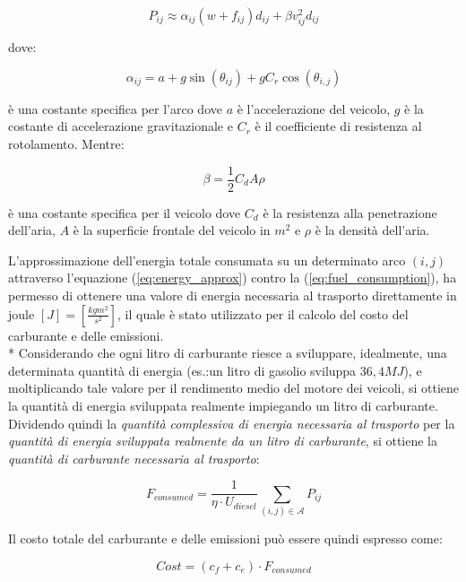 	\begin{equation}
		\label{eq:energy_approx}
		P_{ij} \approx \alpha_{ij}(w + f_{ij})d_{ij} + \beta v_{ij}^2 d_{ij}
	\end{equation}

	dove:

	\begin{equation}
		\label{eq:slope_param}
		\alpha_{ij} = a + g\sin(\theta_{ij}) + gC_r \cos(\theta_{i,j})
	\end{equation}

	è una costante specifica per l’arco dove $a$ è l’accelerazione del veicolo, $g$ è la costante di accelerazione gravitazionale e $C_{r}$ è il coefficiente di resistenza al rotolamento. Mentre:

	\begin{equation}
		\label{eq:vehicle_param}
		\beta = \frac{1}{2}C_d A \rho
	\end{equation}

	è una costante specifica per il veicolo dove $C_{d}$ è la resistenza alla penetrazione dell’aria, $A$ è la superficie frontale del veicolo in $m^2$ e $\rho$ è la densità dell’aria.

	L’approssimazione dell’energia totale consumata su un determinato arco $(i,j)$ attraverso l’equazione (\ref{eq:energy_approx}) contro la (\ref{eq:fuel_consumption}), ha permesso di ottenere una valore di energia necessaria al trasporto direttamente in joule $[J] = \left[ \frac{kg m^2}{s^2} \right]$, il quale è stato utilizzato per il calcolo del costo del carburante e delle emissioni. \\*
	Considerando che ogni litro di carburante riesce a sviluppare, idealmente, una determinata quantità di energia (es.:un litro di gasolio sviluppa $36,4 MJ$), e moltiplicando tale valore per il rendimento medio del motore dei veicoli, si ottiene la quantità di energia sviluppata realmente impiegando un litro di carburante. Dividendo quindi la \emph{quantità complessiva di energia necessaria al trasporto} per la \emph{quantità di energia sviluppata realmente da un litro di carburante}, si ottiene la \emph{quantità di carburante necessaria al trasporto}:

	\begin{equation}
		\label{eq:fuel_consumed}
		F_{consumed} = \frac{1}{\eta \cdot U_{diesel}} \sum_{(i,j) \in \mathcal{A}} P_{ij} 
	\end{equation}

	Il costo totale del carburante e delle emissioni può essere quindi espresso come:

	\begin{equation}
		\label{eq:overall_cost}
		Cost = (c_f + c_e) \cdot F_{consumed}
	\end{equation}


